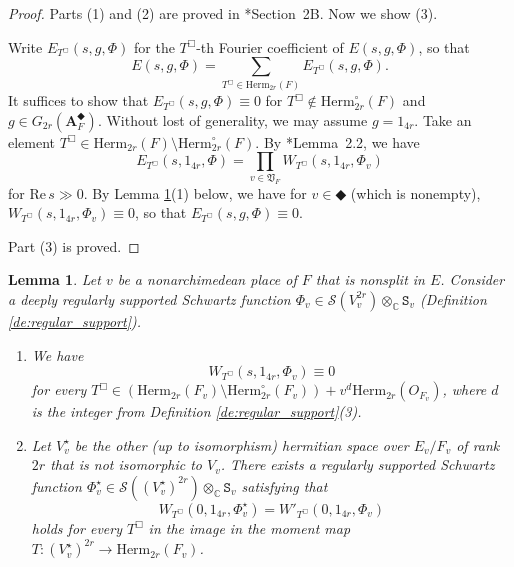 \documentclass[12pt]{amsart}
\numberwithin{equation}{section}
\theoremstyle{plain}
\newtheorem{lem}[proposition]{Lemma}
\theoremstyle{definition}
\theoremstyle{remark}
\renewcommand{\b}[1]{\mathbf{#1}}
\renewcommand{\d}[1]{\mathbb{#1}}
\newcommand{\f}[1]{\mathfrak{#1}}
\renewcommand{\r}[1]{\mathrm{#1}}
\newcommand{\s}[1]{\mathscr{#1}}
\renewcommand{\(}{\left(}
\renewcommand{\)}{\right)}
\newcommand{\bA}{\b A}
\newcommand{\dC}{\d C}
\newcommand{\fV}{\f V}
\newcommand{\sS}{\s S}
\newcommand{\tS}{\mathtt{S}}
\newcommand{\Herm}{\r{Herm}}
\newcommand{\RE}{\r{Re}\,}
\begin{document}
\begin{proof}
Parts (1) and (2) are proved in \cite{Liu12}*{Section~2B}. Now we show (3).

Write $E_{T^\Box}(s,g,\Phi)$ for the $T^\Box$-th Fourier coefficient of $E(s,g,\Phi)$, so that
\[
E(s,g,\Phi)=\sum_{T^\Box\in\Herm_{2r}(F)}E_{T^\Box}(s,g,\Phi).
\]
It suffices to show that $E_{T^\Box}(s,g,\Phi)\equiv 0$ for $T^\Box\not\in\Herm_{2r}^\circ(F)$ and $g\in G_{2r}(\bA_F^\Diamondblack)$. Without lost of generality, we may assume $g=1_{4r}$. Take an element $T^\Box\in\Herm_{2r}(F)\setminus\Herm_{2r}^\circ(F)$. By \cite{Liu12}*{Lemma~2.2}, we have
\[
E_{T^\Box}(s,1_{4r},\Phi)=\prod_{v\in\fV_F}W_{T^\Box}(s,1_{4r},\Phi_v)
\]
for $\RE s\gg 0$. By Lemma \ref{le:eisenstein_series}(1) below, we have for $v\in\Diamondblack$ (which is nonempty), $W_{T^\Box}(s,1_{4r},\Phi_v)\equiv 0$, so that $E_{T^\Box}(s,g,\Phi)\equiv 0$.

Part (3) is proved.
\end{proof}


\begin{lem}\label{le:eisenstein_series}
Let $v$ be a nonarchimedean place of $F$ that is nonsplit in $E$. Consider a deeply regularly supported Schwartz function $\Phi_v\in\sS(V_v^{2r})\otimes_\dC\tS_v$ (Definition \ref{de:regular_support}).
\begin{enumerate}
  \item We have
      \[
      W_{T^\Box}(s,1_{4r},\Phi_v)\equiv 0
      \]
      for every $T^\Box\in\(\Herm_{2r}(F_v)\setminus\Herm_{2r}^\circ(F_v)\)+v^d\Herm_{2r}(O_{F_v})$, where $d$ is the integer from Definition \ref{de:regular_support}(3).

  \item Let $V^\star_v$ be the other (up to isomorphism) hermitian space over $E_v/F_v$ of rank $2r$ that is not isomorphic to $V_v$. There exists a regularly supported Schwartz function $\Phi^\star_v\in\sS((V^\star_v)^{2r})\otimes_\dC\tS_v$ satisfying that
      \[
      W_{T^\Box}(0,1_{4r},\Phi^\star_v)=W'_{T^\Box}(0,1_{4r},\Phi_v)
      \]
      holds for every $T^\Box$ in the image in the moment map $T\colon(V^\star_v)^{2r}\to\Herm_{2r}(F_v)$.
\end{enumerate}
\end{lem}
\end{document}
